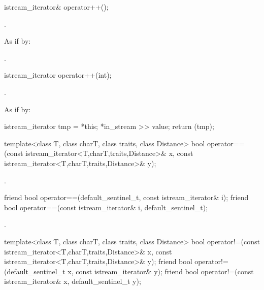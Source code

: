 %
\begin{itemdecl}
istream_iterator& operator++();
\end{itemdecl}

\begin{itemdescr}
\pnum
\requires {}.

\pnum
\effects
As if by: 

\pnum
\returns
{}.
\end{itemdescr}

%
\begin{itemdecl}
istream_iterator operator++(int);
\end{itemdecl}

\begin{itemdescr}
\pnum
\requires {}.

\pnum
\effects
As if by:
\begin{codeblock}
istream_iterator tmp = *this;
*in_stream >> value;
return (tmp);
\end{codeblock}
\end{itemdescr}

%
\begin{itemdecl}
template<class T, class charT, class traits, class Distance>
  bool operator==(const istream_iterator<T,charT,traits,Distance>& x,
                  const istream_iterator<T,charT,traits,Distance>& y);
\end{itemdecl}

\begin{itemdescr}
\pnum
\returns
{}.
\end{itemdescr}

%
\begin{itemdecl}
friend bool operator==(default_sentinel_t, const istream_iterator& i);
friend bool operator==(const istream_iterator& i, default_sentinel_t);
\end{itemdecl}

\begin{itemdescr}
\pnum
\returns
{}.
\end{itemdescr}

%
\begin{itemdecl}
template<class T, class charT, class traits, class Distance>
  bool operator!=(const istream_iterator<T,charT,traits,Distance>& x,
                  const istream_iterator<T,charT,traits,Distance>& y);
friend bool operator!=(default_sentinel_t x, const istream_iterator& y);
friend bool operator!=(const istream_iterator& x, default_sentinel_t y);
\end{itemdecl}

